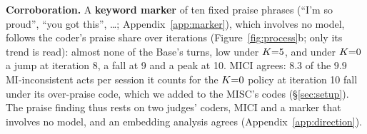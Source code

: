 \textbf{Corroboration.} A
\textbf{keyword marker} of ten fixed praise phrases (``I'm so proud'', ``you got this'', \ldots;
Appendix~\ref{app:marker}), which involves no model, follows the coder's praise share over
iterations (Figure~\ref{fig:process}b; only its trend is read): almost none of the Base's turns,
low under $K{=}5$, and under $K{=}0$ a jump at iteration 8, a fall at 9 and a peak at 10. MICI agrees:
$8.3$ of the $9.9$ MI-inconsistent acts per session it counts for the $K{=}0$ policy at iteration 10
fall under its over-praise code, which we added to the MISC's codes (\S\ref{sec:setup}).
The praise finding thus rests on two judges' coders, MICI and a marker that involves no model, and
an embedding analysis agrees (Appendix~\ref{app:direction}).
